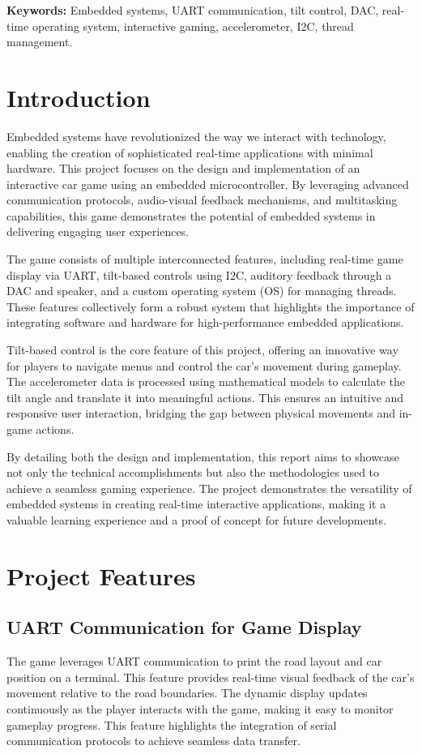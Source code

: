 \documentclass[conference]{IEEEtran}
\begin{document}
\textbf{Keywords:} Embedded systems, UART communication, tilt control, DAC, real-time operating system, interactive gaming, accelerometer, I2C, thread management.

\section{Introduction}
Embedded systems have revolutionized the way we interact with technology, enabling the creation of sophisticated real-time applications with minimal hardware. This project focuses on the design and implementation of an interactive car game using an embedded microcontroller. By leveraging advanced communication protocols, audio-visual feedback mechanisms, and multitasking capabilities, this game demonstrates the potential of embedded systems in delivering engaging user experiences.

The game consists of multiple interconnected features, including real-time game display via UART, tilt-based controls using I2C, auditory feedback through a DAC and speaker, and a custom operating system (OS) for managing threads. These features collectively form a robust system that highlights the importance of integrating software and hardware for high-performance embedded applications.

Tilt-based control is the core feature of this project, offering an innovative way for players to navigate menus and control the car's movement during gameplay. The accelerometer data is processed using mathematical models to calculate the tilt angle and translate it into meaningful actions. This ensures an intuitive and responsive user interaction, bridging the gap between physical movements and in-game actions.

By detailing both the design and implementation, this report aims to showcase not only the technical accomplishments but also the methodologies used to achieve a seamless gaming experience. The project demonstrates the versatility of embedded systems in creating real-time interactive applications, making it a valuable learning experience and a proof of concept for future developments.


\section{Project Features}
\subsection{UART Communication for Game Display}
The game leverages UART communication to print the road layout and car position on a terminal. This feature provides real-time visual feedback of the car's movement relative to the road boundaries. The dynamic display updates continuously as the player interacts with the game, making it easy to monitor gameplay progress. This feature highlights the integration of serial communication protocols to achieve seamless data transfer.
\end{document}
